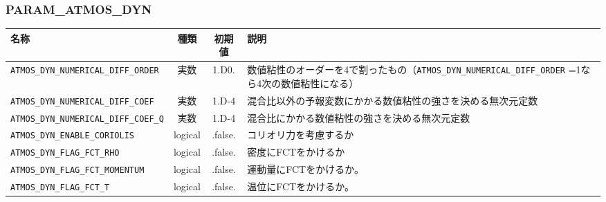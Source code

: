 \subsubsection{PARAM\_ATMOS\_DYN}
\begin{tabularx}{150mm}{|l|c|c|X|} \hline
 \rowcolor[gray]{0.9} 名称 & 種類 & 初期値 & 説明 \\ \hline
 \verb|ATMOS_DYN_NUMERICAL_DIFF_ORDER| & 実数 & 1.D0. & 数値粘性のオーダーを4で割ったもの（\verb|ATMOS_DYN_NUMERICAL_DIFF_ORDER| =1なら4次の数値粘性になる） \\ \hline
 \verb|ATMOS_DYN_NUMERICAL_DIFF_COEF| & 実数 & 1.D-4 & 混合比以外の予報変数にかかる数値粘性の強さを決める無次元定数\\ \hline
 \verb|ATMOS_DYN_NUMERICAL_DIFF_COEF_Q| & 実数 & 1.D-4 & 混合比にかかる数値粘性の強さを決める無次元定数\\ \hline
 \verb|ATMOS_DYN_ENABLE_CORIOLIS| & logical & .false. & コリオリ力を考慮するか \\ \hline
 \verb|ATMOS_DYN_FLAG_FCT_RHO| & logical & .false. & 密度にFCTをかけるか \\ \hline
 \verb|ATMOS_DYN_FLAG_FCT_MOMENTUM| & logical & .false. & 運動量にFCTをかけるか。 \\ \hline
 \verb|ATMOS_DYN_FLAG_FCT_T| & logical & .false. & 温位にFCTをかけるか。\\ \hline
\end{tabularx}

